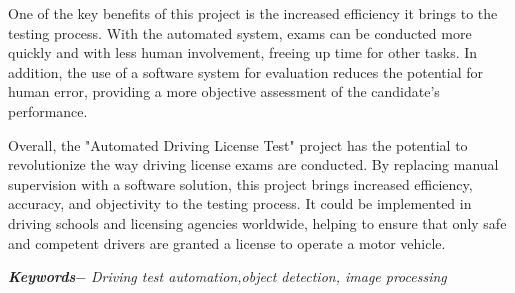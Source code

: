 One of the key benefits of this project is the increased efficiency it brings to the testing process. With the automated system, exams can be conducted more quickly and with less human involvement, freeing up time for other tasks. In addition, the use of a software system for evaluation reduces the potential for human error, providing a more objective assessment of the candidate's performance.

Overall, the "Automated Driving License Test" project has the potential to revolutionize the way driving license exams are conducted. By replacing manual supervision with a software solution, this project brings increased efficiency, accuracy, and objectivity to the testing process. It could be implemented in driving schools and licensing agencies worldwide, helping to ensure that only safe and competent drivers are granted a license to operate a motor vehicle.


\par
\textbf{\textit{Keywords$-$}} \emph{Driving test automation,object detection, image processing}


{
\KECadjusttocspacings %
\makeatletter
\def\@makeschapterhead#1{%
  {\newpage \parindent \z@ \raggedright
    \normalfont
    \interlinepenalty\@M
    \center \fontsize{16pt}{1} \bfseries \MakeUppercase{#1}\par\nobreak
    \vskip 18\p@ %
  }}
\makeatother 

\tableofcontents %
\listoffigures %
\listoftables %
}

